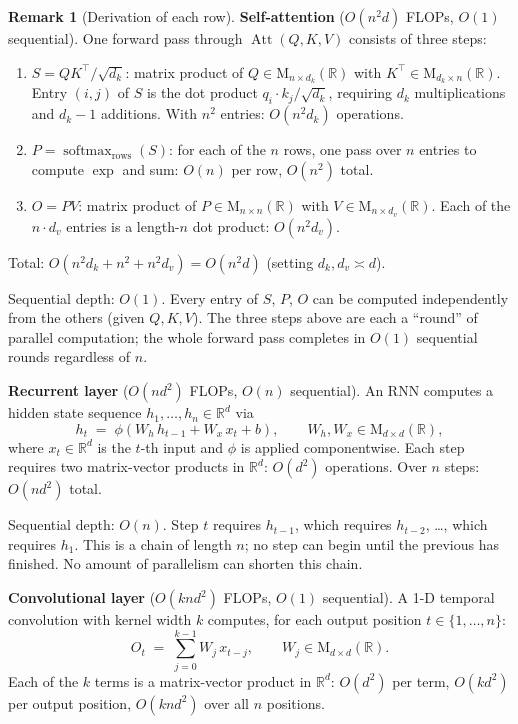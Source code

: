 \documentclass[11pt]{amsart}
\theoremstyle{plain}
\theoremstyle{definition}
\newtheorem{remark}[theorem]{Remark}
\newcommand{\R}{\mathbb{R}}
\newcommand{\Mat}[2]{\mathrm{M}_{#1 \times #2}(\R)}
\newcommand{\softmax}{\operatorname{softmax}}
\newcommand{\Att}{\operatorname{Att}}
\begin{document}
\begin{remark}[Derivation of each row]
\leavevmode

\textbf{Self-attention} ($O(n^2 d)$ FLOPs, $O(1)$ sequential).
One forward pass through $\Att(Q,K,V)$ consists of three steps:
\begin{enumerate}[label=(\roman*)]
    \item $S = QK^\top/\sqrt{d_k}$: matrix product of $Q\in\Mat{n}{d_k}$ with
    $K^\top\in\Mat{d_k}{n}$.  Entry $(i,j)$ of $S$ is the dot product
    $q_i\cdot k_j/\sqrt{d_k}$, requiring $d_k$ multiplications and $d_k-1$
    additions.  With $n^2$ entries: $O(n^2 d_k)$ operations.

    \item $P = \softmax_{\mathrm{rows}}(S)$: for each of the $n$ rows, one pass
    over $n$ entries to compute $\exp$ and sum: $O(n)$ per row, $O(n^2)$ total.

    \item $O = PV$: matrix product of $P\in\Mat{n}{n}$ with $V\in\Mat{n}{d_v}$.
    Each of the $n\cdot d_v$ entries is a length-$n$ dot product: $O(n^2 d_v)$.
\end{enumerate}
Total: $O(n^2 d_k + n^2 + n^2 d_v) = O(n^2 d)$ (setting $d_k,d_v \asymp d$).

Sequential depth: $O(1)$.  Every entry of $S$, $P$, $O$ can be computed
independently from the others (given $Q,K,V$).  The three steps above are
each a ``round'' of parallel computation; the whole forward pass completes
in $O(1)$ sequential rounds regardless of $n$.

\medskip
\textbf{Recurrent layer} ($O(nd^2)$ FLOPs, $O(n)$ sequential).
An RNN computes a hidden state sequence $h_1, \ldots, h_n \in \R^d$ via
\[
    h_t \;=\; \phi(W_h\, h_{t-1} + W_x\, x_t + b),
    \qquad W_h, W_x \in \Mat{d}{d},
\]
where $x_t \in \R^d$ is the $t$-th input and $\phi$ is applied componentwise.
Each step requires two matrix-vector products in $\R^d$: $O(d^2)$ operations.
Over $n$ steps: $O(nd^2)$ total.

Sequential depth: $O(n)$.  Step $t$ requires $h_{t-1}$, which requires
$h_{t-2}$, \ldots, which requires $h_1$.  This is a chain of length $n$;
no step can begin until the previous has finished.  No amount of parallelism
can shorten this chain.

\medskip
\textbf{Convolutional layer} ($O(knd^2)$ FLOPs, $O(1)$ sequential).
A 1-D temporal convolution with kernel width $k$ computes, for each output
position $t \in \{1,\ldots,n\}$:
\[
    O_t \;=\; \sum_{j=0}^{k-1} W_j\, x_{t-j}, \qquad W_j \in \Mat{d}{d}.
\]
Each of the $k$ terms is a matrix-vector product in $\R^d$: $O(d^2)$ per term,
$O(kd^2)$ per output position, $O(knd^2)$ over all $n$ positions.


\end{remark}
\end{document}
